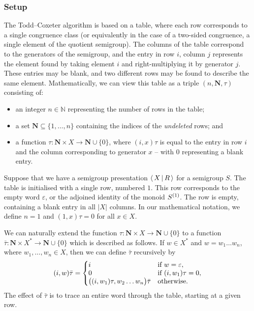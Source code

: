 \subsubsection{Setup}

The Todd--Coxeter algorithm is based on a table, where each row corresponds to a
single congruence class (or equivalently in the case of a two-sided congruence,
a single element of the quotient
semigroup).  The columns of the table correspond to the generators of the
semigroup, and the entry in row $i$, column $j$ represents the element found by
taking element $i$ and right-multiplying it by generator $j$.  These entries may
be blank, and two different rows may be found to describe the same element.
Mathematically, we can view this table as a triple $(n, \mathbf{N}, \tau)$
consisting of:
\begin{itemize}
\item an integer $n \in \mathbb{N}$ representing the number of rows in the table;
\item a set $\mathbf{N} \subseteq \{1, \ldots, n\}$ containing the indices of the
  \textit{undeleted} rows; and
\item a function $\tau: \mathbf{N} \times X \to \mathbf{N} \cup \{0\}$, where
  $(i, x)\tau$ is equal to the entry in row $i$ and the column corresponding to
  generator $x$ -- with $0$ representing a blank entry.
\end{itemize}

Suppose that we have a semigroup presentation $\left\langle \, X \, \middle| \, R \, \right\rangle$ for a semigroup
$S$.  The table is initialised with a single row, numbered $1$.  This row
corresponds to the empty word $\varepsilon$, or the adjoined identity of the
monoid $S^{(1)}{}$.  The row is empty, containing a blank entry in all $|X|$ columns.
In our mathematical notation, we define $n=1$ and
$(1,x)\tau = 0$ for all $x \in X$.

We can naturally extend the function
$\tau: \mathbf{N} \times X \to \mathbf{N} \cup \{0\}$
to a function
$\bar{\tau}: \mathbf{N} \times X^* \to \mathbf{N} \cup \{0\}$
which is described as follows.
If $w \in X^*$ and $w=w_1 \ldots w_n$, where $w_1, \ldots, w_n \in X$,
then we can define $\bar\tau$ recursively by
$$
(i, w)\bar\tau = \left\{
\begin{matrix*}[l]
  i & \textnormal{if~} w=\varepsilon,\\
  0 & \textnormal{if~} (i, w_1)\tau=0,\\
  \big((i, w_1)\tau, w_2 \ldots w_n\big)\bar\tau & \textnormal{otherwise}.
\end{matrix*} \right.
$$
The effect of $\bar\tau$ is to trace an entire word through the table, starting
at a given row.

